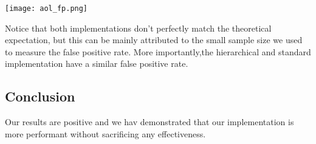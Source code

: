 \begin{center}
    \texttt{[image: aol\_fp.png]}
\end{center}

Notice that both implementations don't perfectly match the theoretical expectation, but this can be mainly attributed to the small sample size we used to measure the false positive rate.
More importantly,the hierarchical and standard implementation have a similar false positive rate. 

\subsection{Conclusion}
Our results are positive and we hav demonstrated that our implementation is more performant without sacrificing any effectiveness.


